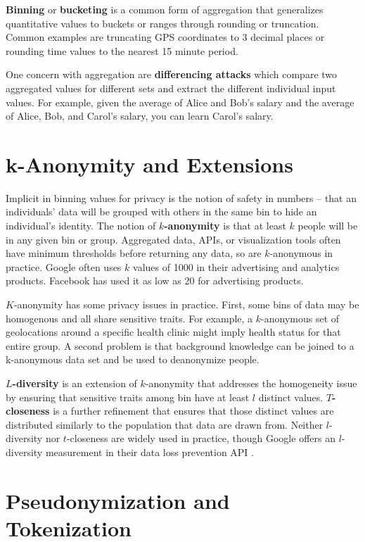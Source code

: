 \documentclass[nobib]{tufte-handout}
\begin{document}
\textbf{Binning} or \textbf{bucketing} is a common form of aggregation that
generalizes quantitative values to buckets or ranges through rounding or
truncation. Common examples are truncating GPS coordinates to 3 decimal
places or rounding time values to the nearest 15 minute period.

One concern with aggregation are \textbf{differencing attacks} which compare two
aggregated values for different sets and extract the different individual input
values. For example, given the average of Alice and Bob’s salary and the average
of Alice, Bob, and Carol’s salary, you can learn Carol’s salary.

\section{k-Anonymity and Extensions}

Implicit in binning values for privacy is the notion of safety in numbers --
that an individuals’ data will be grouped with others in the same bin to hide
an individual's identity. The notion of \textbf{$k$-anonymity}
\cite{DBLP:journals/ijufks/Sweene02} is that at least $k$ people will be in any
given bin or group. Aggregated data, APIs, or visualization tools often have
minimum thresholds before returning any data, so are $k$-anonymous in practice.
Google often uses $k$ values of 1000 in their advertising and analytics products.
Facebook has used it as low as 20 for advertising products.

$K$-anonymity has some privacy issues in practice. First, some bins of data may
be homogenous and all share sensitive traits. For example, a $k$-anonymous set
of geolocations around a specific health clinic might imply health status for
that entire group. A second problem is that background knowledge can be joined
to a k-anonymous data set and be used to deanonymize people.

\textbf{$L$-diversity} \cite{DBLP:conf/icde/MachanavajjhalaGKV06} is an extension
of $k$-anonymity that addresses the homogeneity issue by ensuring that sensitive
traits among bin have at least $l$ distinct values. \textbf{$T$-closeness}
\cite{DBLP:conf/icde/LiLV07} is a further refinement that ensures that those
distinct values are distributed similarly to the population that data are drawn
from. Neither $l$-diversity nor $t$-closeness are widely used in practice,
though Google offers an $l$-diversity measurement in their data loss prevention
API \cite{google-risk-analysis}.

\section{Pseudonymization and Tokenization}
\end{document}
